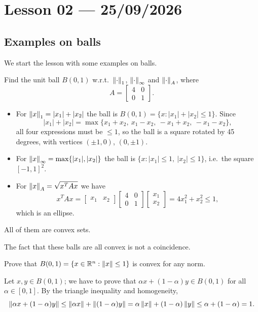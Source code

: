 
\section{Lesson 02 --- 25/09/2026}

\subsection{Examples on balls}
We start the lesson with some examples on balls.

\begin{example}[Exercise 1.1]
Find the unit ball $B(0,1)$ w.r.t.\ $\left\lVert \cdot \right\rVert_1$, $\left\lVert \cdot \right\rVert_\infty$ and $\left\lVert \cdot \right\rVert_A$, where
\[ A = \begin{bmatrix}
    4 & 0 \\
    0 & 1
\end{bmatrix}.
\]
\begin{itemize}
    \item For $\left\lVert x \right\rVert_1 = |x_1|+|x_2|$ the ball is $B(0,1) = \{ x : |x_1|+|x_2|\le1\}$. Since
    \[
     |x_1|+|x_2| =
      \max\{x_1 + x_2,\ x_1 - x_2,\ -x_1 + x_2,\ -x_1 - x_2\},
    \]
    all four expressions must be $\le 1$, so the ball is a square rotated by 45 degrees, with vertices $(\pm 1, 0)$, $(0, \pm 1)$.
    \item For $\left\lVert x \right\rVert_\infty = \max\{|x_1|, |x_2|\}$ the ball is $\{x : |x_1| \le 1,\ |x_2| \le 1\}$, i.e.\ the square $[-1,1]^2$.
    \item For $\left\lVert x \right\rVert_A = \sqrt{x^TAx}$ we have
    \[
        x^TAx = \begin{bmatrix}x_1 & x_2\end{bmatrix}\begin{bmatrix}
        4 & 0 \\
        0 & 1
    \end{bmatrix}\begin{bmatrix}x_1 \\ x_2\end{bmatrix} = 4x_1^2 + x_2^2 \le 1,
    \]
    which is an ellipse.
\end{itemize}
All of them are convex sets.
\end{example}

The fact that these balls are all convex is not a coincidence.

\begin{example}[Exercise 1.4]
Prove that $B(0,1)=\{x \in \mathbb{R}^n:\left\lVert x \right\rVert\le1\}$ is convex for any norm.

Let $x,y \in B(0,1)$; we have to prove that $\alpha x + (1-\alpha)y \in B(0,1)$ for all $\alpha \in[0,1]$. By the triangle inequality and homogeneity,
\[
    \left\lVert \alpha x + (1-\alpha)y \right\rVert \le \left\lVert \alpha x \right\rVert + \left\lVert (1-\alpha)y \right\rVert = \alpha\left\lVert x \right\rVert+ (1-\alpha)\left\lVert y \right\rVert \le \alpha + (1-\alpha) = 1.
\]
\end{example}

